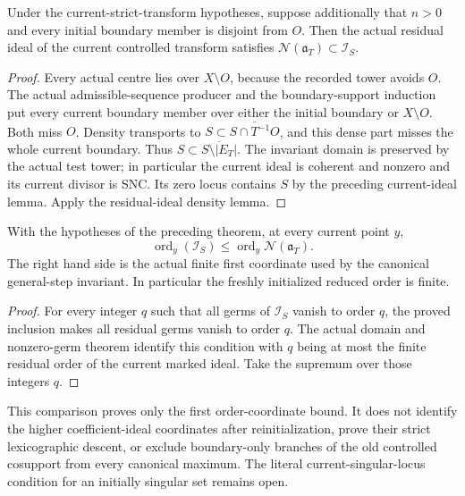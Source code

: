 \begin{theorem}
\label{hir:current-residual-ideal-in-reduced-ideal}
\leanok
Under the current-strict-transform hypotheses, suppose additionally that
$n>0$ and every initial boundary member is disjoint from $O$.
Then the actual residual ideal of the current controlled transform satisfies
$\mathcal N(\mathfrak a_T)\subset\mathcal I_S$.
\end{theorem}
\begin{proof}
Every actual centre lies over $X\setminus O$, because the recorded tower
avoids $O$. The actual admissible-sequence producer and the boundary-support
induction put every current boundary member over either the initial
boundary or $X\setminus O$. Both miss $O$. Density transports to
$S\subset\overline{S\cap T^{-1}O}$, and this dense part misses the whole
current boundary. Thus $S\subset\overline{S\setminus|E_T|}$.
The invariant domain is preserved by the actual test tower; in particular
the current ideal is coherent and nonzero and its current divisor is SNC.
Its zero locus contains $S$ by the preceding current-ideal lemma. Apply
the residual-ideal density lemma.
\end{proof}

\begin{theorem}
\label{hir:fresh-order-bounded-current-residual-order}
\leanok
With the hypotheses of the preceding theorem, at every current point $y$,
\[
 \operatorname{ord}_y(\mathcal I_S)
 \leq \operatorname{ord}_y\mathcal N(\mathfrak a_T).
\]
The right hand side is the actual finite first coordinate used by the
canonical general-step invariant. In particular the freshly initialized
reduced order is finite.
\end{theorem}
\begin{proof}
For every integer $q$ such that all germs of $\mathcal I_S$ vanish to order
$q$, the proved inclusion makes all residual germs vanish to order $q$.
The actual domain and nonzero-germ theorem identify this condition with
$q$ being at most the finite residual order of the current marked ideal.
Take the supremum over those integers $q$.
\end{proof}

This comparison proves only the first order-coordinate bound. It does not
identify the higher coefficient-ideal coordinates after reinitialization,
prove their strict lexicographic descent, or exclude boundary-only branches
of the old controlled cosupport from every canonical maximum. The literal
current-singular-locus condition for an initially singular set remains open.
